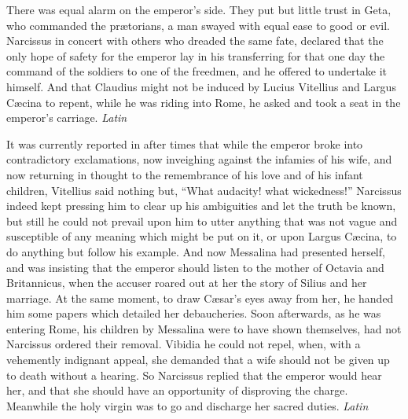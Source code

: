 There was equal alarm on the emperor's side. They put but little trust in Geta, who commanded the prætorians, a man swayed with equal ease to good or evil. Narcissus in concert with others who dreaded the same fate, declared that the only hope of safety for the emperor lay in his transferring for that one day the command of the soldiers to one of the freedmen, and he offered to undertake it himself. And that Claudius might not be induced by Lucius Vitellius and Largus Cæcina to repent, while he was riding into Rome, he asked and took a seat in the emperor's carriage. \emph{Latin}


It was currently reported in after times that while the emperor broke into contradictory exclamations, now inveighing against the infamies of his wife, and now returning in thought to the remembrance of his love and of his infant children, Vitellius said nothing but, ``What audacity! what wickedness!'' Narcissus indeed kept pressing him to clear up his ambiguities and let the truth be known, but still he could not prevail upon him to utter anything that was not vague and susceptible of any meaning which might be put on it, or upon Largus Cæcina, to do anything but follow his example. And now Messalina had presented herself, and was insisting that the emperor should listen to the mother of Octavia and Britannicus, when the accuser roared out at her the story of Silius and her marriage. At the same moment, to draw Cæsar's eyes away from her, he handed him some papers which detailed her debaucheries. Soon afterwards, as he was entering Rome, his children by Messalina were to have shown themselves, had not Narcissus ordered their removal. Vibidia he could not repel, when, with a vehemently indignant appeal, she demanded that a wife should not be given up to death without a hearing. So Narcissus replied that the emperor would hear her, and that she should have an opportunity of disproving the charge. Meanwhile the holy virgin was to go and discharge her sacred duties. \emph{Latin}


